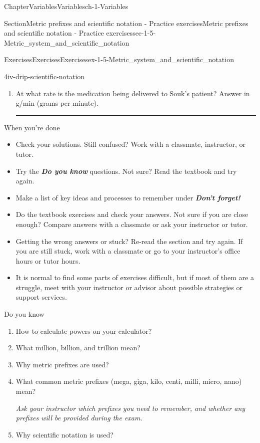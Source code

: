 \documentclass[twoside,11pt,]{book}
\newcommand{\alert}[1]{\textbf{\textit{#1}}}
\newlength{\workspacestrutwidth}
\numberwithin{equation}{section}
\begin{document}
\begin{chapterptx}{Chapter}{Variables}{}{Variables}{}{}{ch-1-Variables}
\begin{sectionptx}{Section}{Metric prefixes and scientific notation - Practice exercises}{}{Metric prefixes and scientific notation - Practice exercises}{}{}{sec-1-5-Metric_system_and_scientific_notation}
\begin{exercises-subsection-numberless}{Exercises}{Exercises}{}{Exercises}{}{}{ex-1-5-Metric_system_and_scientific_notation}
\begin{divisionexercise}{4}{}{}{iv-drip-scientific-notation}
\begin{enumerate}[label=(\alph*),ref=\alph*]
\par\rule{\workspacestrutwidth}{2.25cm}%
\item{}At what rate is the medication being delivered to Souk's patient? Answer in g\slash{}min (grams per minute).%
\par\rule{\workspacestrutwidth}{2.25cm}%
\end{enumerate}%
\end{divisionexercise}%
\end{exercises-subsection-numberless}
\begin{conclusion}{When you're done \textellipsis{}}%
%
\begin{itemize}[label=\textbullet]
\item{}Check your solutions. Still confused? Work with a classmate, instructor, or tutor.%
\item{}Try the \alert{Do you know} questions. Not sure? Read the textbook and try again.%
\item{}Make a list of key ideas and processes to remember under \alert{Don't forget!}%
\item{}Do the textbook exercises and check your answers. Not sure if you are close enough? Compare answers with a classmate or ask your instructor or tutor.%
\item{}Getting the wrong answers or stuck? Re-read the section and try again. If you are still stuck, work with a classmate or go to your instructor's office hours or tutor hours.%
\item{}It is normal to find some parts of exercises difficult, but if most of them are a struggle, meet with your instructor or advisor about possible strategies or support services.%
\end{itemize}
%
\end{conclusion}%
\begin{conclusion}{Do you know \textellipsis{}}%
%
\begin{enumerate}[label={\Alph*.}]
\item{}How to calculate powers on your calculator?%
\item{}What million, billion, and trillion mean?%
\item{}Why metric prefixes are used?%
\item{}What common metric prefixes (mega, giga, kilo, centi, milli, micro, nano) mean?%
\par
\emph{Ask your instructor which prefixes you need to remember, and whether any prefixes will be provided during the exam.}%
\item{}Why scientific notation is used?%

\end{enumerate}
\end{conclusion}
\end{sectionptx}
\end{chapterptx}
\end{document}
